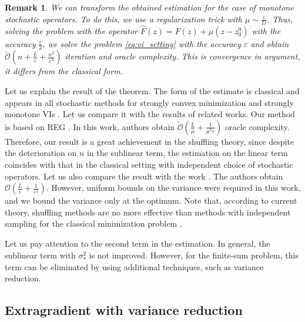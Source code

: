 \documentclass{article}
\newtheorem{remark}{Remark}
\begin{document}
\begin{remark}\label{rem:eg}
    We can transform the obtained estimation for the case of monotone stochastic operators. To do this, we use a regularization trick with $\mu\sim \frac{\varepsilon}{D}$. Thus, solving the problem with the operator $\hat{F}(z) = F(z) + \mu(z-z_0^0)$ with the accuracy $\frac{\varepsilon}{2}$, we solve the problem \eqref{eq:vi_setting} with the accuracy $\varepsilon$ and obtain $\mathcal{\widetilde{O}}\left(n + \frac{L}{\varepsilon} + \frac{n^2}{\varepsilon^3}\right)$ iteration and oracle complexity. This is convergence in argument, it differs from the classical form.
\end{remark}
\vspace{-2mm}
Let us explain the result of the theorem. The form of the estimate is classical and appears in all stochastic methods for strongly convex minimization \citep{moulines2011non, stich2019unified} and strongly monotone VIs \citep{beznosikov2020distributed, mishchenko2020revisiting}. Let us compare it with the results of related works. Our method is based on \textsc{REG} \citep{mishchenko2020revisiting}. In this work, authors obtain $\mathcal{\widetilde{O}}\left(\frac{L}{\mu} + \frac{1}{\mu^2\varepsilon}\right)$ oracle complexity. Therefore, our result is a great achievement in the shuffling theory, since despite the deterioration on $n$ in the sublinear term, the estimation on the linear term coincides with that in the classical setting with independent choice of stochastic operators. Let us also compare the result with the work \citep{juditsky2011solving}. The authors obtain $\mathcal{O}\left(\frac{L}{\varepsilon} + \frac{1}{\varepsilon^2}\right)$. However, uniform bounds on the variance were required in this work, and we bound the variance only at the optimum. Note that, according to current theory, shuffling methods are no more effective than methods with independent sampling for the classical minimization problem \citep{mishchenko2020random, koloskova2024convergence}.

Let us pay attention to the second term in the estimation.  In general, the sublinear term with $\sigma_*^2$ is not improved. However, for the finite-sum problem, this term can be eliminated by using additional techniques, such as variance reduction.

\vspace{-2mm}
\subsection{Extragradient with variance reduction}
\vspace{-2mm}
\end{document}
